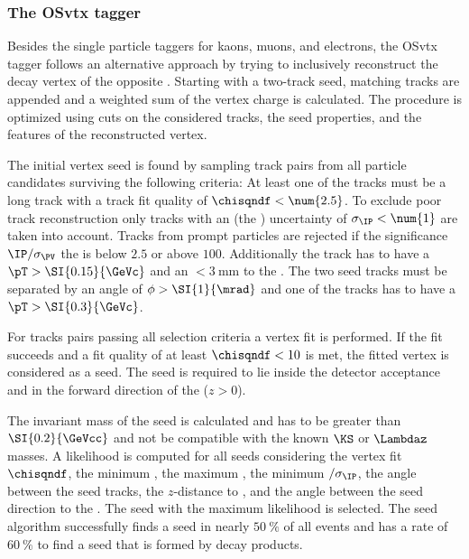 \subsubsection{The \acl{OSvtx} tagger}
\label{sec:flavour_tagging:os:vertex}

Besides the single particle taggers for kaons, muons, and electrons, the
\ac{OSvtx} tagger follows an alternative approach by trying to inclusively
reconstruct the decay vertex of the opposite \bhadron. Starting with a two-track
seed, matching tracks are appended and a weighted sum of the vertex charge is
calculated. The procedure is optimized using cuts on the considered tracks, the
seed properties, and the features of the reconstructed vertex.

The initial vertex seed is found by sampling track pairs from all particle
candidates surviving the following criteria: At least one of the tracks must be
a long track with a track fit quality of $\chisqndf<\num{2.5}$. To exclude poor
track reconstruction only tracks with an \IP (\wrt the \PV) uncertainty of
$\sigma_\text{\IP}<\num{1}$ are taken into account. Tracks from prompt particles
are rejected if the \IP significance $\text{\IP}/\sigma_\text{\PV}$ \wrt the \PV
is below $\num{2.5}$ or above $\num{100}$. Additionally the track has to have a
$\pT>\SI{0.15}{\GeVc}$ and an \IP$<\SI{3}{\milli\metre}$ \wrt to the \PV. The
two seed tracks must be separated by an angle of $\phi>\SI{1}{\mrad}$ and one of
the tracks has to have a $\pT>\SI{0.3}{\GeVc}$.

For tracks pairs passing all selection criteria a vertex fit is performed. If
the fit succeeds and a fit quality of at least $\chisqndf<10$ is met, the fitted
vertex is considered as a seed. The seed is required to lie inside the detector
acceptance and in the forward direction of the \PV ($z>0$). 

The invariant mass of the seed is calculated and has to be greater than
$\SI{0.2}{\GeVcc}$ and not be compatible with the known $\KS$ or $\Lambdaz$
masses. %
A likelihood is computed for all seeds considering the vertex fit $\chisqndf$,
the minimum \pT, the maximum \PV \IP, the minimum \PV \IP$/\sigma_\text{\IP}$,
the angle between the seed tracks, the $z$-distance to \PV, and the angle
between the seed direction \wrt to the \PV. The seed with the maximum likelihood
is selected. The seed algorithm successfully finds a seed in nearly
$\SI{50}{\percent}$ of all events and has a rate of $\SI{60}{\percent}$ to find
a seed that is formed by \bhadron decay products.


